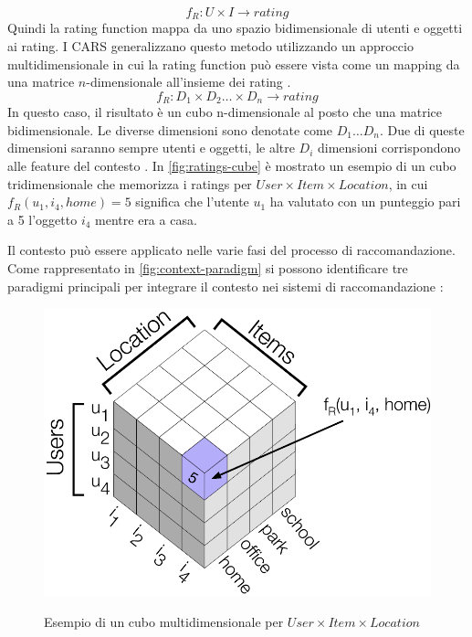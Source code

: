 $$
f_R : U \times I \rightarrow rating
$$
Quindi la rating function mappa da uno spazio bidimensionale di utenti e oggetti ai rating.
I CARS generalizzano questo metodo utilizzando un approccio multidimensionale in cui la rating function può essere vista come un mapping da una matrice $n$-dimensionale all'insieme dei rating \cite{survey-mattia}.
$$
f_R : D_1 \times D_2 \dots \times D_n \rightarrow rating
$$
In questo caso, il risultato è un cubo n-dimensionale al posto che una matrice bidimensionale. Le diverse dimensioni sono denotate come $D_1 \dots D_n$. Due di queste dimensioni saranno sempre utenti e oggetti, le altre $D_i$ dimensioni corrispondono alle feature del contesto \cite{recsys-book}. In \autoref{fig:ratings-cube} è mostrato un esempio di un cubo tridimensionale che memorizza i ratings per $User \times Item \times Location$, in cui $f_R(u_1, i_4, home) = 5$ significa che l'utente $u_1$ ha valutato con un punteggio pari a 5 l'oggetto $i_4$ mentre era a casa.

Il contesto può essere applicato nelle varie fasi del processo di raccomandazione. Come rappresentato in \autoref{fig:context-paradigm} si possono identificare tre paradigmi principali per integrare il contesto nei sistemi di raccomandazione \cite{recsys-handbook}:

\begin{figure}
  \centering
  \includegraphics[scale=0.75]{immagini/rating_cube.png}
  \caption{Esempio di un cubo multidimensionale per $User \times Item \times Location$}
  \cite{survey-mattia}
  \label{fig:ratings-cube}
\end{figure}

